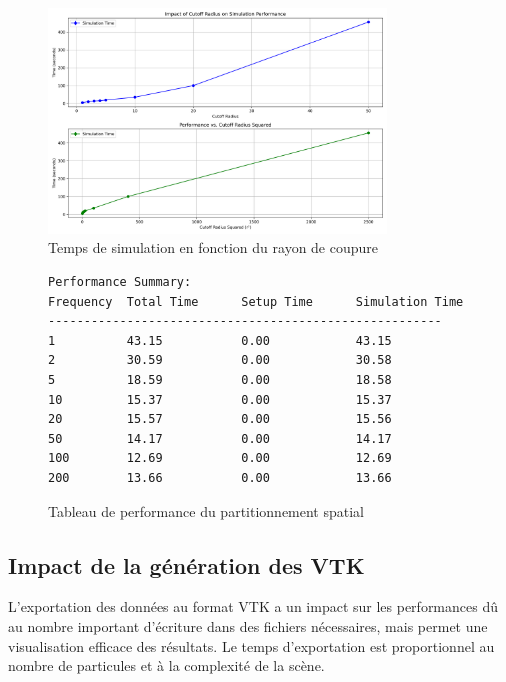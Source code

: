 \documentclass[12pt,a4paper]{article}
\begin{document}
\begin{figure}[H]
\centering
\includegraphics[width=0.8\textwidth]{perf/cutoff_radius_performance.png}
\caption{Temps de simulation en fonction du rayon de coupure}
\end{figure}

\begin{figure}[H]
\centering
\begin{minipage}{\textwidth}
\begin{verbatim}
Performance Summary:
Frequency  Total Time      Setup Time      Simulation Time
-------------------------------------------------------
1          43.15           0.00            43.15          
2          30.59           0.00            30.58          
5          18.59           0.00            18.58          
10         15.37           0.00            15.37          
20         15.57           0.00            15.56          
50         14.17           0.00            14.17          
100        12.69           0.00            12.69          
200        13.66           0.00            13.66     
\end{verbatim}
\end{minipage}
\caption{Tableau de performance du partitionnement spatial}
\end{figure}

\subsection{Impact de la génération des VTK}
L'exportation des données au format VTK a un impact sur les performances dû au nombre important d'écriture dans des fichiers nécessaires, mais permet une visualisation efficace des résultats. Le temps d'exportation est proportionnel au nombre de particules et à la complexité de la scène.
\end{document}

